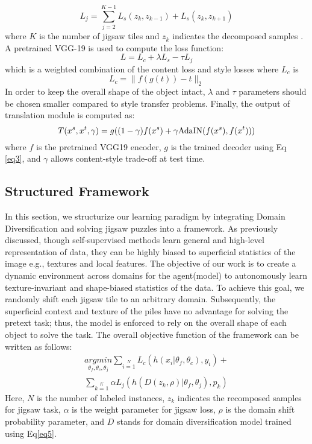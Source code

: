 \documentclass[10pt,twocolumn,letterpaper]{article}
\begin{document}
\begin{equation}
L_{j} = \sum_{j = 2}^{K - 1}L_s(z_k, z_{k-1}) + L_s(z_k, z_{k+1}) 
\end{equation}
where $K$ is the number of jigsaw tiles and $z_k$ indicates the decomposed samples . A pretrained VGG-19 is used to compute the loss function:
\begin{equation}
L = L_c + \lambda L_s - \tau L_{j}
\end{equation}\label{eq5}
which is a weighted combination of the content loss and style losses where $L_c$ is
\begin{equation}
L_c = \|f(g(t)) - t\|_2
\end{equation}\label{eq6}
In order to keep the overall shape of the object intact, $\lambda$ and $\tau$ parameters should be chosen smaller compared to style transfer problems.
Finally, the output of translation module is computed as:
\begin{equation}
	T({x^s}, {x^t}, \gamma) = g((1 - \gamma)f(x^s) + \gamma \textnormal{AdaIN}(f(x^s), f(x^t)))
\end{equation}\label{eq7}
where $f$ is the pretrained VGG19 encoder, $g$ is the trained decoder using Eq \ref{eq3}, and $\gamma$ allows content-style trade-off at test time.

\subsection{Structured Framework}\label{sec_framework}
In this section, we structurize our learning paradigm by integrating Domain Diversification and solving jigsaw puzzles into a framework. As previously discussed, though self-supervised methods learn general and high-level representation of data, they can be highly biased to superficial statistics of the image e.g., textures and local features. The objective of our work is to create a dynamic environment across domains for the agent(model) to autonomously learn texture-invariant and shape-biased statistics of the data.
To achieve this goal, we randomly shift each jigsaw tile to an arbitrary domain. Subsequently, the superficial context and texture of the piles have no advantage for solving the pretext task; thus, the model is enforced to rely on the overall shape of each object to solve the task. The overall objective function of the framework can be written as follows:
\begin{multline}
	\underset{\theta_f, \theta_c, \theta_j}{argmin}
	\sum\limits_{i=1}\limits^{N}
	L_c (h(x_i | \theta_f, \theta_c), y_i)
	 + \\
	\sum\limits_{k=1}\limits^{K}
	\alpha L_j (h(D(z_k, \rho) | \theta_f, \theta_j), p_k)
\end{multline}
Here, $N$ is the number of labeled instances, $z_k$ indicates the recomposed samples for jigsaw task, $\alpha$ is the weight parameter for jigsaw loss, $\rho$ is the domain shift probability parameter, and $D$ stands for domain diversification model trained using Eq\ref{eq5}.
\end{document}
